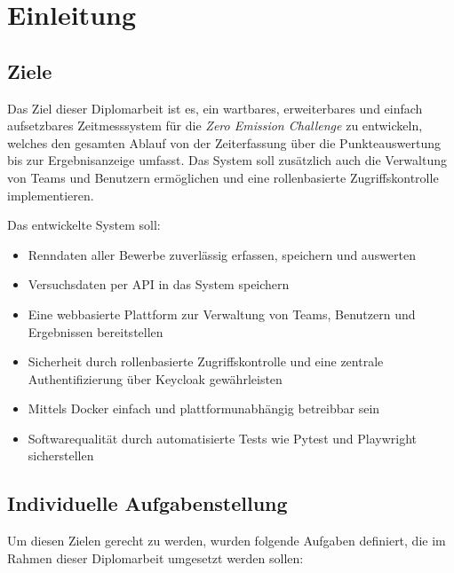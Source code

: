 \section{Einleitung}
\subsection{Ziele}

Das Ziel dieser Diplomarbeit ist es, ein wartbares, erweiterbares und einfach 
aufsetzbares Zeitmesssystem für die \textit{Zero Emission Challenge} zu entwickeln, 
welches den gesamten Ablauf von der Zeiterfassung über die Punkteauswertung bis zur Ergebnisanzeige umfasst.
Das System soll zusätzlich auch die Verwaltung von Teams und Benutzern ermöglichen und 
eine rollenbasierte Zugriffskontrolle implementieren.

Das entwickelte System soll:
\begin{itemize}
    \item Renndaten aller Bewerbe zuverlässig erfassen, speichern und auswerten
      \item Versuchsdaten per \gls{API} in das System speichern
    \item Eine webbasierte Plattform zur Verwaltung von Teams, Benutzern und 
          Ergebnissen bereitstellen
    \item Sicherheit durch rollenbasierte Zugriffskontrolle und eine zentrale 
          Authentifizierung über Keycloak gewährleisten
    \item Mittels Docker einfach und plattformunabhängig betreibbar sein
      \item Softwarequalität durch automatisierte Tests wie Pytest und Playwright sicherstellen
\end{itemize}
\newpage

\subsection{Individuelle Aufgabenstellung}

Um diesen Zielen gerecht zu werden, wurden folgende Aufgaben definiert, die im Rahmen dieser Diplomarbeit umgesetzt werden sollen:

